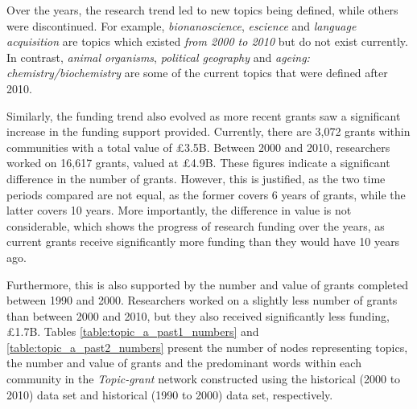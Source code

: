 Over the years, the research trend led to new topics being defined, while others were discontinued. For example, \textit{bionanoscience}, \textit{escience} and \textit{language acquisition} are topics which existed \textit{from 2000 to 2010} but do not exist currently. In contrast, \textit{animal organisms}, \textit{political geography} and \textit{ageing: chemistry/biochemistry} are some of the current topics that were defined after 2010.

Similarly, the funding trend also evolved as more recent grants saw a significant increase in the funding support provided. Currently, there are 3,072 grants within communities with a total value of \pounds3.5B. Between 2000 and 2010, researchers worked on 16,617 grants, valued at \pounds4.9B. These figures indicate a significant difference in the number of grants. However, this is justified, as the two time periods compared are not equal, as the former covers 6 years of grants, while the latter covers 10 years. More importantly, the difference in value is not considerable, which shows the progress of research funding over the years, as current grants receive significantly more funding than they would have 10 years ago.

Furthermore, this is also supported by the number and value of grants completed between 1990 and 2000. Researchers worked on a slightly less number of grants than between 2000 and 2010, but they also received significantly less funding, \pounds1.7B. Tables \ref{table:topic_a_past1_numbers} and \ref{table:topic_a_past2_numbers} present the number of nodes representing topics, the number and value of grants and the predominant words within each community in the \textit{Topic-grant} network constructed using the historical (2000 to 2010) data set and historical (1990 to 2000) data set, respectively.

\clearpage

